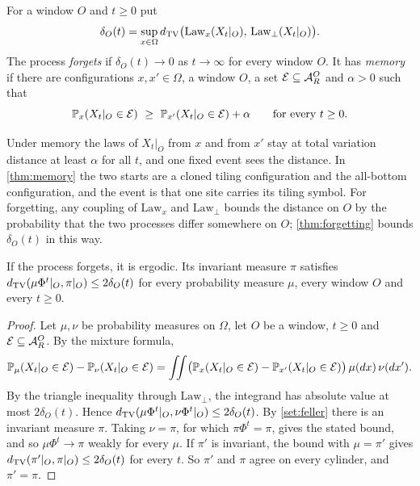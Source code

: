 \begin{definition}\label{set:def-forget}
For a window $O$ and $t\ge0$ put
\[
\delta_O(t)=\sup_{x\in\Omega}d_{\mathrm{TV}}\bigl(\mathrm{Law}_x(X_t|_O),\,\mathrm{Law}_\bot(X_t|_O)\bigr).
\]
The process \emph{forgets} if $\delta_O(t)\to0$ as $t\to\infty$ for every window $O$. It has \emph{memory} if there are configurations $x,x'\in\Omega$, a window $O$, a set $\mathcal E\subseteq\mathcal{A}_R^O$ and $\alpha>0$ such that
\[
\Prob_x(X_t|_O\in\mathcal E)\ \ge\ \Prob_{x'}(X_t|_O\in\mathcal E)+\alpha\qquad\text{for every }t\ge0 .
\]
\end{definition}

Under memory the laws of $X_t|_O$ from $x$ and from $x'$ stay at total variation distance at least $\alpha$ for all $t$, and one fixed event sees the distance. In \cref{thm:memory} the two starts are a cloned tiling configuration and the all-bottom configuration, and the event is that one site carries its tiling symbol. For forgetting, any coupling of $\mathrm{Law}_x$ and $\mathrm{Law}_\bot$ bounds the distance on $O$ by the probability that the two processes differ somewhere on $O$; \cref{thm:forgetting} bounds $\delta_O(t)$ in this way.

\begin{lemma}\label{set:forget-ergodic}
If the process forgets, it is ergodic. Its invariant measure $\pi$ satisfies $d_{\mathrm{TV}}(\mu\Phi^t|_O,\pi|_O)\le2\delta_O(t)$ for every probability measure $\mu$, every window $O$ and every $t\ge0$.
\end{lemma}

\begin{proof}
Let $\mu,\nu$ be probability measures on $\Omega$, let $O$ be a window, $t\ge0$ and $\mathcal E\subseteq\mathcal{A}_R^O$. By the mixture formula,
\[
\mathbb{P}_\mu(X_t|_O\in\mathcal E)-\mathbb{P}_\nu(X_t|_O\in\mathcal E)
=\iint\bigl(\mathbb{P}_x(X_t|_O\in\mathcal E)-\mathbb{P}_{x'}(X_t|_O\in\mathcal E)\bigr)\,\mu(dx)\,\nu(dx').
\]
By the triangle inequality through $\mathrm{Law}_\bot$, the integrand has absolute value at most $2\delta_O(t)$. Hence $d_{\mathrm{TV}}(\mu\Phi^t|_O,\nu\Phi^t|_O)\le2\delta_O(t)$. By \cref{set:feller} there is an invariant measure $\pi$. Taking $\nu=\pi$, for which $\pi\Phi^t=\pi$, gives the stated bound, and so $\mu\Phi^t\to\pi$ weakly for every $\mu$. If $\pi'$ is invariant, the bound with $\mu=\pi'$ gives $d_{\mathrm{TV}}(\pi'|_O,\pi|_O)\le2\delta_O(t)$ for every $t$. So $\pi'$ and $\pi$ agree on every cylinder, and $\pi'=\pi$.
\end{proof}

